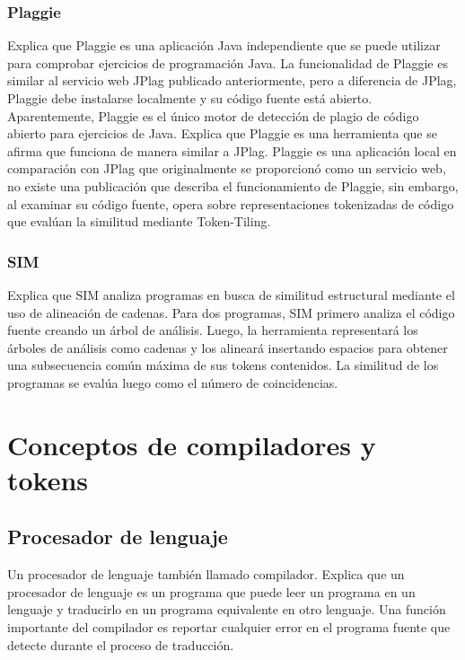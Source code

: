 \subsubsection{Plaggie}
 \cite{Ahtiainen2006} Explica que Plaggie es una aplicación Java independiente que se puede utilizar para comprobar ejercicios de programación Java. La funcionalidad de Plaggie es similar al servicio web JPlag publicado anteriormente, pero a diferencia de JPlag, Plaggie debe instalarse localmente y su código fuente está abierto. Aparentemente, Plaggie es el único motor de detección de plagio de código abierto para ejercicios de Java. \cite{Cheers2021} Explica que Plaggie es una herramienta que se afirma que funciona de manera similar a JPlag. Plaggie es una aplicación local en comparación con JPlag que originalmente se proporcionó como un servicio web, no existe una publicación que describa el funcionamiento de Plaggie, sin embargo, al examinar su código fuente, opera sobre representaciones tokenizadas de código que evalúan la similitud mediante Token-Tiling.
\subsubsection{SIM}
\cite{Cheers2021} Explica que SIM analiza programas en busca de similitud estructural mediante el uso de alineación de cadenas. Para dos programas, SIM primero analiza el código fuente creando un árbol de análisis. Luego, la herramienta representará los árboles de análisis como cadenas y los alineará insertando espacios para obtener una subsecuencia común máxima de sus tokens contenidos. La similitud de los programas se evalúa luego como el número de coincidencias.

\section{Conceptos de compiladores y tokens}
\subsection{Procesador de lenguaje}
Un procesador de lenguaje también llamado compilador. \cite{Aho2008} Explica que un procesador de lenguaje es un programa que puede leer un programa en un lenguaje y traducirlo en un programa equivalente en otro lenguaje. Una función importante del compilador es reportar cualquier error en el programa fuente que detecte durante el proceso de traducción.

